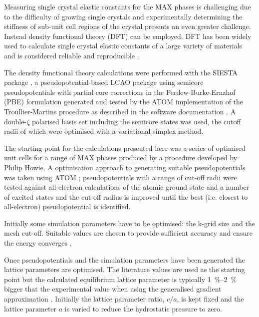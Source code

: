 Measuring single crystal elastic constants for the MAX phases is challenging due to the difficulty of growing single crystals and experimentally determining the stiffness of sub-unit cell regions of the crystal presents an even greater challenge. Instead density functional theory (DFT) can be employed. DFT has been widely used to calculate single crystal elastic constants of a large variety of materials and is considered reliable and reproducible \cite{Lejaeghere2016}. 

The density functional theory calculations were performed with the SIESTA package \cite{soler2002}, a pseudopotential-based LCAO package using semicore pseudopotentials with partial core corrections in the Perdew-Burke-Ernzhof (PBE) formulation generated and tested by the ATOM implementation \cite{soler2002} of the Troullier-Martins procedure \cite{Troullier1991,Troullier1991a} as described in the software documentation \cite{ATOM_manual}. A double-$\zeta$ polarised basis set including the semicore states was used, the cutoff radii of which were optimised with a variational simplex method.

The starting point for the calculations presented here was a series of optimised unit cells for a range of MAX phases produced by a procedure developed by Philip Howie. A optimisation approach to generating suitable pseudopotentials was taken using ATOM \cite{ATOM_manual}; pseudopotentials with a range of cut-off radii were tested against all-electron calculations of the atomic ground state and a number of excited states and the cut-off radius is improved until the best (i.e. closest to all-electron) pseudopotential is identified. 

Initially some simulation parameters have to be optimised: the k-grid size and the mesh cut-off. Suitable values are chosen to provide sufficient accuracy and ensure the energy converges \cite{SIESTA_manual}.

Once pseudopotentials and the simulation parameters have been generated the lattice parameters are optimised. The literature values are used as the starting point but the calculated equilibrium lattice parameter is typically \SIrange{1}{2}{\percent} bigger that the experimental value when using the generalised gradient approximation \cite{Staroverov2004,Wu2006,Staroverov2008erratum}. Initially the lattice parameter ratio, $c/a$, is kept fixed and the lattice parameter $a$ is varied to reduce the hydrostatic pressure to zero.


